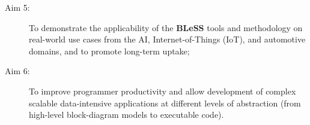 \documentclass[a4paper,11pt]{article}
\newcommand{\project}[1]{\textbf{#1}\xspace}
\newcommand{\BLESS}{\project{BLeSS}}
\newcommand{\TheProject}{\BLESS}
\begin{document}
\begin{description}
\item[Aim 5:]
 \noindent
 To demonstrate the applicability of the \TheProject{} tools and methodology on real-world use cases from the AI, Internet-of-Things (IoT), and
 automotive domains, and to promote long-term uptake;

\item[Aim 6:]

\noindent
 To improve programmer productivity and allow development of complex scalable data-intensive applications at different
 levels of abstraction (from high-level block-diagram models to executable code).

\end{description}




\end{document}
